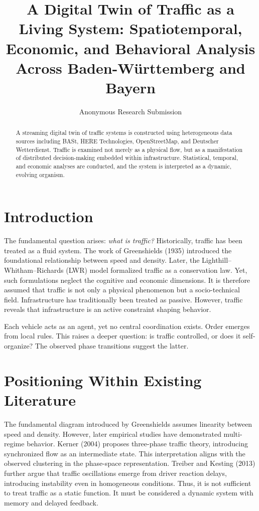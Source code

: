 \documentclass[12pt]{article}
\author{Anonymous Research Submission}
\title{A Digital Twin of Traffic as a Living System: Spatiotemporal, Economic, and Behavioral Analysis Across Baden-Württemberg and Bayern}
\author{}
\date{}
\begin{document}
\sloppy
\maketitle

\begin{abstract}
A streaming digital twin of traffic systems is constructed using heterogeneous data sources including BASt, HERE Technologies, OpenStreetMap, and Deutscher Wetterdienst. Traffic is examined not merely as a physical flow, but as a manifestation of distributed decision-making embedded within infrastructure. Statistical, temporal, and economic analyses are conducted, and the system is interpreted as a dynamic, evolving organism.
\end{abstract}

\section{Introduction}

The fundamental question arises: \textit{what is traffic?}
Historically, traffic has been treated as a fluid system. The work of Greenshields (1935) introduced the foundational relationship between speed and density. Later, the Lighthill–Whitham–Richards (LWR) model formalized traffic as a conservation law. Yet, such formulations neglect the cognitive and economic dimensions.
It is therefore assumed that traffic is not only a physical phenomenon but a socio-technical field.
Infrastructure has traditionally been treated as passive. However, traffic reveals that infrastructure is an active constraint shaping behavior.

Each vehicle acts as an agent, yet no central coordination exists. Order emerges from local rules.
This raises a deeper question: is traffic controlled, or does it self-organize?
The observed phase transitions suggest the latter.
\section{Positioning Within Existing Literature}

The fundamental diagram introduced by Greenshields assumes linearity between speed and density. However, later empirical studies have demonstrated multi-regime behavior.
Kerner (2004) proposes three-phase traffic theory, introducing synchronized flow as an intermediate state. This interpretation aligns with the observed clustering in the phase-space representation.
Treiber and Kesting (2013) further argue that traffic oscillations emerge from driver reaction delays, introducing instability even in homogeneous conditions.
Thus, it is not sufficient to treat traffic as a static function. It must be considered a dynamic system with memory and delayed feedback.
\end{document}
